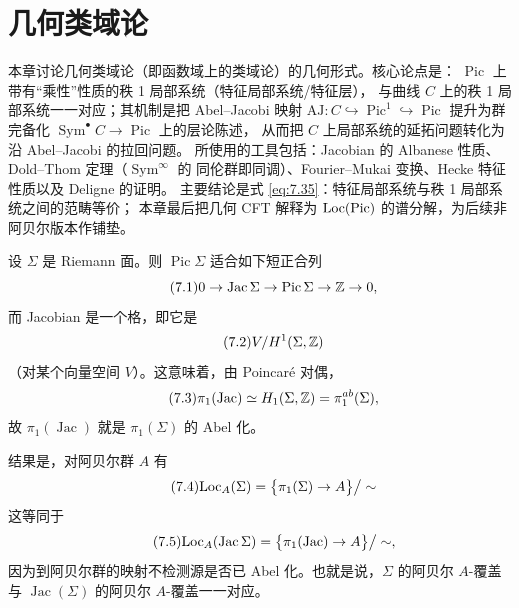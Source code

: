 \chapter{几何类域论}\label{ch:07}

\begin{keytakeaways}
本章讨论几何类域论（即函数域上的类域论）的几何形式。核心论点是：
$\operatorname{Pic}$ 上带有“乘性”性质的秩 1 局部系统（特征局部系统/特征层），
与曲线 $C$ 上的秩 1 局部系统一一对应；其机制是把 Abel--Jacobi 映射
$\mathrm{AJ}\colon C\hookrightarrow\operatorname{Pic}^1\hookrightarrow\operatorname{Pic}$
提升为群完备化 $\operatorname{Sym}^\bullet C\to\operatorname{Pic}$ 上的层论陈述，
从而把 $C$ 上局部系统的延拓问题转化为沿 Abel--Jacobi 的拉回问题。
所使用的工具包括：Jacobian 的 Albanese 性质、Dold--Thom 定理（$\operatorname{Sym}^\infty$ 的
同伦群即同调）、Fourier--Mukai 变换、Hecke 特征性质以及 Deligne 的证明。
主要结论是式 \eqref{eq:7.35}：特征局部系统与秩 1 局部系统之间的范畴等价；
本章最后把几何 CFT 解释为 $\mathrm{Loc}(\operatorname{Pic})$ 的谱分解，为后续非阿贝尔版本作铺垫。
\end{keytakeaways}

设 $\Sigma$ 是 Riemann 面。则 $\operatorname{Pic}\Sigma$ 适合如下短正合列
\begin{equation}\tag{7.1}\label{eq:7.1}
0\to\operatorname{Jac}\Sigma\to\operatorname{Pic}\Sigma\to\mathbb{Z}\to 0,
\end{equation}
而 Jacobian 是一个格，即它是
\begin{equation}\tag{7.2}\label{eq:7.2}
V/H^1(\Sigma,\mathbb{Z})
\end{equation}
（对某个向量空间 $V$）。这意味着，由 Poincaré 对偶，
\begin{equation}\tag{7.3}\label{eq:7.3}
\pi_1(\operatorname{Jac})\simeq H_1(\Sigma,\mathbb{Z})=\pi_1^{ab}(\Sigma),
\end{equation}
故 $\pi_1(\operatorname{Jac})$ 就是 $\pi_1(\Sigma)$ 的 Abel 化。

结果是，对阿贝尔群 $A$ 有
\begin{equation}\tag{7.4}\label{eq:7.4}
\mathrm{Loc}_A(\Sigma)=\bigl\{\pi_1(\Sigma)\to A\bigr\}\big/\sim
\end{equation}
这等同于
\begin{equation}\tag{7.5}\label{eq:7.5}
\mathrm{Loc}_A(\operatorname{Jac}\Sigma)=\bigl\{\pi_1(\operatorname{Jac})\to A\bigr\}\big/\sim,
\end{equation}
因为到阿贝尔群的映射不检测源是否已 Abel 化。也就是说，$\Sigma$ 的阿贝尔 $A$-覆盖与
$\operatorname{Jac}(\Sigma)$ 的阿贝尔 $A$-覆盖一一对应。

